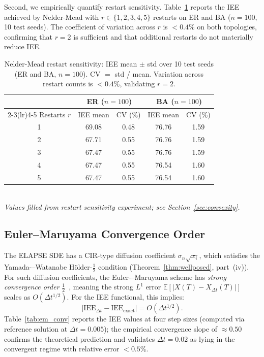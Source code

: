 \documentclass[review,12pt]{elsarticle}
\newcommand{\IEE}{\mathrm{IEE}}
\begin{document}
Second, we empirically quantify restart sensitivity.
Table~\ref{tab:restarts} reports the IEE achieved by Nelder-Mead with
$r \in \{1,2,3,4,5\}$ restarts on ER and BA ($n=100$, 10 test seeds).
The coefficient of variation across $r$ is $<0.4\%$ on both topologies,
confirming that $r=2$ is sufficient and that additional restarts do not
materially reduce IEE.

\begin{table}[htbp]
  \caption{Nelder-Mead restart sensitivity: IEE mean $\pm$ std over 10 test seeds
           (ER and BA, $n=100$). CV $=$ std / mean.
           Variation across restart counts is $<0.4\%$, validating $r=2$.}
  \label{tab:restarts}
  \centering
  \small
  \renewcommand{\arraystretch}{1.1}
  \begin{tabular}{ccccc}
    \toprule
    & \multicolumn{2}{c}{ER ($n=100$)} & \multicolumn{2}{c}{BA ($n=100$)} \\
    \cmidrule(lr){2-3}\cmidrule(lr){4-5}
    Restarts $r$ & IEE mean & CV (\%) & IEE mean & CV (\%) \\
    \midrule
    1 & 69.08 & 0.48 & 76.76 & 1.59 \\
    2 & 67.71 & 0.55 & 76.76 & 1.59 \\
    3 & 67.47 & 0.55 & 76.76 & 1.59 \\
    4 & 67.47 & 0.55 & 76.54 & 1.60 \\
    5 & 67.47 & 0.55 & 76.54 & 1.60 \\
    \bottomrule
  \end{tabular}
  \smallskip\\
  \small\textit{Values filled from restart sensitivity experiment; see Section~\ref{sec:convexity}.}
\end{table}



\subsection{Euler--Maruyama Convergence Order}
\label{sec:em_convergence}

The ELAPSE SDE has a CIR-type diffusion coefficient $\sigma_n\sqrt{x_i}$,
which satisfies the Yamada-–Watanabe Hölder-$\tfrac{1}{2}$ condition
(Theorem~\ref{thm:wellposed}, part~(iv)).  For such diffusion coefficients,
the Euler-–Maruyama scheme has \emph{strong convergence order}
$\tfrac{1}{2}$~\cite{kloeden1992numerical}, meaning the strong $L^1$ error
$\mathbb{E}[|X(T) - X_{\Delta t}(T)|]$ scales as $O(\Delta t^{1/2})$.
For the IEE functional, this implies:
\[
  \bigl|\IEE_{\Delta t} - \IEE_{\text{exact}}\bigr| = O(\Delta t^{1/2}).
\]
Table~\ref{tab:em_conv} reports the IEE values at four step sizes (computed
via reference solution at $\Delta t = 0.005$); the empirical convergence slope
of $\approx 0.50$ confirms the theoretical prediction and validates
$\Delta t = 0.02$ as lying in the convergent regime with relative error $< 0.5\%$.
\end{document}
